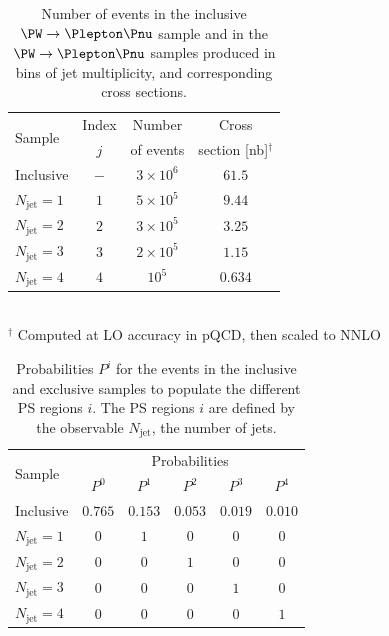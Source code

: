 \documentclass[twocolumn,epjc3]{svjour3}
\newcommand{\jet}{\ensuremath{\textrm{jet}}\xspace}
\begin{document}
\begin{table}
\caption{
  Number of events in the inclusive $\PW \to \Plepton\Pnu$ sample and in the $\PW \to \Plepton\Pnu$ samples produced in bins of jet multiplicity,
  and corresponding cross sections.
}
\label{tab:samples_WJets_vs_Njet}
\def\arraystretch{1.3}
\begin{tabular}{l|c|c|c}
\hline
\multirow{2}{12mm}{Sample} & Index & Number    & Cross                    \\
                           & $j$   & of events & section [nb]$^{\dagger}$ \\
\hline
\hline
Inclusive                  & $-$   & $3 \times 10^{6}$ & $61.5$           \\
\hline
$N_{\jet} = 1$             & $1$   & $5 \times 10^{5}$ & $9.44$           \\
$N_{\jet} = 2$             & $2$   & $3 \times 10^{5}$ & $3.25$           \\
$N_{\jet} = 3$             & $3$   & $2 \times 10^{5}$ & $1.15$           \\
$N_{\jet} = 4$             & $4$   & $         10^{5}$ & $0.634$          \\
\hline
\end{tabular}
\\ $^{\dagger}$ Computed at LO accuracy in pQCD, then scaled to NNLO
\end{table}

\begin{table}
\caption{
  Probabilities $P^{i}$ for the events in the inclusive and exclusive samples to populate the different PS regions $i$.
  The PS regions $i$ are defined by the observable $N_{\jet}$, the number of jets.
}
\label{tab:probabilities_WJets_vs_Njet}
\def\arraystretch{1.3}
\begin{tabular}{l|ccccc}
\hline
\multirow{2}{12mm}{Sample} & \multicolumn{5}{c}{Probabilities}               \\
                           & $P^{0}$ & $P^{1}$ & $P^{2}$ & $P^{3}$ & $P^{4}$ \\
\hline
\hline
Inclusive                  & $0.765$ & $0.153$ & $0.053$ & $0.019$ & $0.010$ \\
\hline
$N_{\jet} = 1$             & $0$     & $1$     & $0$     & $0$     & $0$     \\
$N_{\jet} = 2$             & $0$     & $0$     & $1$     & $0$     & $0$     \\
$N_{\jet} = 3$             & $0$     & $0$     & $0$     & $1$     & $0$     \\
$N_{\jet} = 4$             & $0$     & $0$     & $0$     & $0$     & $1$     \\
\hline
\end{tabular}
\end{table}
\end{document}
